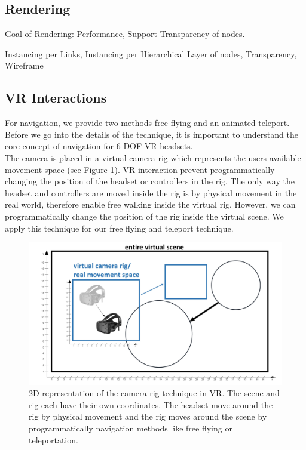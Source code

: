 \subsection{Rendering}
\label{sec:rendering}
Goal of Rendering: 
Performance, Support Transparency of nodes. 

Instancing per Links, 
Instancing per Hierarchical Layer of nodes, 
Transparency,
Wireframe

\subsection{VR Interactions}
\label{sec:vrInteractions}

For navigation, we provide two methods free flying and an animated teleport.
Before we go into the details of the technique, it is important to understand the core concept of navigation for 6-DOF VR headsets.\\
The camera is placed in a virtual camera rig which represents the users available movement space (see Figure \ref{fig:vrCameraRig}). 
VR interaction prevent programmatically changing the position of the headset or controllers in the rig. 
The only way the headset and controllers are moved inside the rig is by physical movement in the real world, therefore enable free walking inside the virtual rig.
However, we can programmatically change the position of the rig inside the virtual scene. 
We apply this technique for our free flying and teleport technique.
\begin{figure}[h]
    \centering
    \includegraphics[width=1\textwidth]{graphics/vrCameraRig.jpg}
    \caption{2D representation of the camera rig technique in VR. The scene and rig each have their own coordinates. The headset move around the rig by physical movement and the rig moves around the scene by programmatically navigation methods like free flying or teleportation.} 
    \label{fig:vrCameraRig} 
\end{figure}

